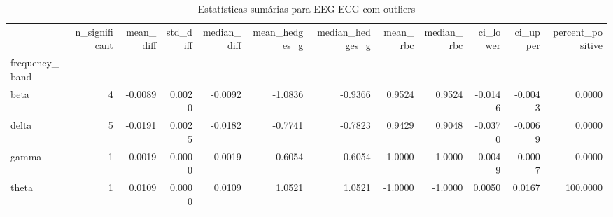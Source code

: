\begin{table}[htbp]
\centering
\begin{tabular}{lrrrrrrrrrrr}
\toprule
 & n_significant & mean_diff & std_diff & median_diff & mean_hedges_g & median_hedges_g & mean_rbc & median_rbc & ci_lower & ci_upper & percent_positive \\
frequency_band &  &  &  &  &  &  &  &  &  &  &  \\
\midrule
beta & 4 & -0.0089 & 0.0020 & -0.0092 & -1.0836 & -0.9366 & 0.9524 & 0.9524 & -0.0146 & -0.0043 & 0.0000 \\
delta & 5 & -0.0191 & 0.0025 & -0.0182 & -0.7741 & -0.7823 & 0.9429 & 0.9048 & -0.0370 & -0.0069 & 0.0000 \\
gamma & 1 & -0.0019 & 0.0000 & -0.0019 & -0.6054 & -0.6054 & 1.0000 & 1.0000 & -0.0049 & -0.0007 & 0.0000 \\
theta & 1 & 0.0109 & 0.0000 & 0.0109 & 1.0521 & 1.0521 & -1.0000 & -1.0000 & 0.0050 & 0.0167 & 100.0000 \\
\bottomrule
\end{tabular}
\caption{Estatísticas sumárias para EEG-ECG com outliers}
\label{tab:summary_eeg_ecg_with}
\end{table}
